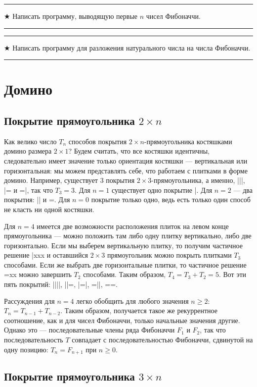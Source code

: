 \documentclass[14pt]{book}
\newenvironment{task}
 { \vspace{2ex}\hrule\vspace{2ex}$\bigstar$ }
 { \vspace{2ex}\hrule\vspace{2ex} }
\begin{document}
\begin{task}
Написать программу, выводящую первые $n$ чисел Фибоначчи.
\end{task}

\begin{task}
Написать программу для разложения натурального числа на числа Фибоначчи.
\end{task}

\section{Домино}

\subsection{Покрытие прямоугольника $2\times n$}

Как велико число $T_n$ способов покрытия $2\times n$-прямоугольника костяшками домино размера
$2\times 1$? Будем считать, что все костяшки идентичны, следовательно имеет значение только
ориентация костяшки --- вертикальная или горизонтальная: мы можем представлять себе, что
работаем с плитками в форме домино. Например, существует $3$ покрытия $2\times 3$-прямоугольника,
а именно, |||, |= и =|, так что $T_3 = 3$. Для $n=1$ существует одно покрытие |. Для $n=2$
--- два покрытия: || и =. Для $n=0$ покрытие только одно, ведь есть только один
способ не класть ни одной костяшки.

Для $n=4$ имеется две возможности расположения плиток на левом конце прямоугольника
--- можно положить там либо одну плитку вертикально, либо две горизонтально. Если мы выберем
вертикальную плитку, то получим частичное решение |xxx и оставшийся $2\times 3$ прямоугольник
можно покрыть плитками $T_3$ способами. Если же выбрать две горизонтальные плитки, то
частичное решение =xx можно завершить $T_2$ способами. Таким образом, $T_4=T_3+T_2=5$.
Вот эти пять покрытий: ||||, ||=, |=|, =||, ==.

Рассуждения для $n=4$ легко обобщить для любого значения $n \ge 2$: $T_n = T_{n-1} + T_{n-2}$.
Таким образом, получается такое же рекуррентное соотношение, как и для чисел Фибоначчи,
только начальные значения другие. Однако это --- последовательные члены ряда Фибоначчи
$F_1$ и $F_2$, так что последовательность $T$ совпадает с последовательностью Фибоначчи,
сдвинутой на одну позицию: $T_n = F_{n+1} \text{ при $n \ge 0$}$.

\subsection{Покрытие прямоугольника $3\times n$}
\end{document}
